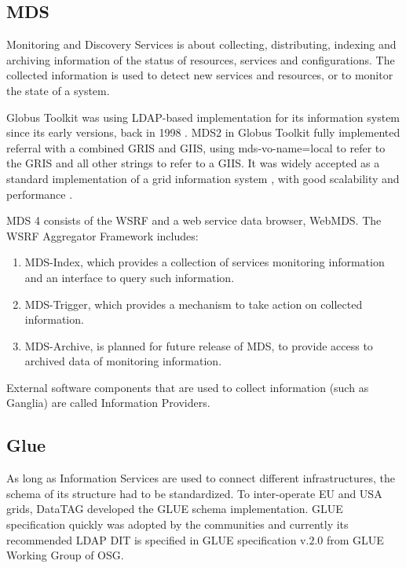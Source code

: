 \subsection{\ac{MDS}}
Monitoring and Discovery Services is about collecting, distributing, indexing and archiving information of the status of resources, services and configurations. The collected information is used to detect new services and resources, or to monitor the state of a system.

Globus Toolkit was using LDAP-based implementation for its information system since its early versions, back in 1998 \cite{von1998usage}. \ac{MDS}2 in Globus Toolkit fully implemented referral with a combined \ac{GRIS} and \ac{GIIS}, using mds-vo-name=local to refer to the \ac{GRIS} and all other strings to refer to a \ac{GIIS}. It was widely accepted as a standard implementation of a grid information system \cite{945188}, with good scalability and performance \cite{zhang2004performance}.


\ac{MDS} 4 consists of the \ac{WSRF} and a web service data browser, WebMDS. The \ac{WSRF} Aggregator Framework includes:

\begin{enumerate}
  \item MDS-Index, which provides a collection of services monitoring information and an interface to query such information.
  \item MDS-Trigger, which provides a mechanism to take action on collected information.
  \item MDS-Archive, is planned for future release of MDS, to provide access to archived data of monitoring information.
\end{enumerate}

External software components that are used to collect information (such as Ganglia)\cite{gangliaWSRF} are called Information Providers.


\subsection{Glue}
As long as Information Services are used to connect different infrastructures, the schema of its structure had to be standardized. To inter-operate EU and USA grids, DataTAG developed the \ac{GLUE} schema implementation. \ac{GLUE} specification quickly was adopted by the communities and currently its recommended LDAP \ac{DIT} is specified in \ac{GLUE} specification v.$2.0$ from GLUE Working Group of \ac{OSG}.

